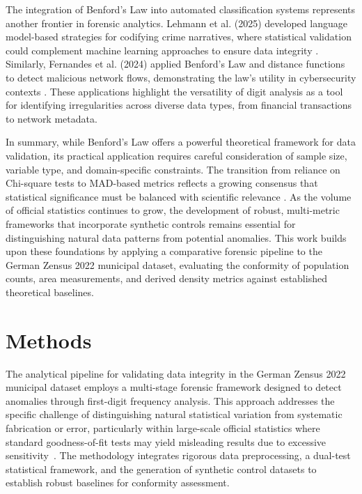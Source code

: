 \documentclass[11pt,a4paper]{article}
\begin{document}
The integration of Benford's Law into automated classification systems represents another frontier in forensic analytics. Lehmann et al. (2025) developed language model-based strategies for codifying crime narratives, where statistical validation could complement machine learning approaches to ensure data integrity \cite{Lehmann2025AutomatedCO}. Similarly, Fernandes et al. (2024) applied Benford's Law and distance functions to detect malicious network flows, demonstrating the law's utility in cybersecurity contexts \cite{Fernandes2024UnveilingMN}. These applications highlight the versatility of digit analysis as a tool for identifying irregularities across diverse data types, from financial transactions to network metadata.

In summary, while Benford's Law offers a powerful theoretical framework for data validation, its practical application requires careful consideration of sample size, variable type, and domain-specific constraints. The transition from reliance on Chi-square tests to MAD-based metrics reflects a growing consensus that statistical significance must be balanced with scientific relevance \cite{Kossler2024SomeNI}. As the volume of official statistics continues to grow, the development of robust, multi-metric frameworks that incorporate synthetic controls remains essential for distinguishing natural data patterns from potential anomalies. This work builds upon these foundations by applying a comparative forensic pipeline to the German Zensus 2022 municipal dataset, evaluating the conformity of population counts, area measurements, and derived density metrics against established theoretical baselines.

\section{Methods}
The analytical pipeline for validating data integrity in the German Zensus 2022 municipal dataset employs a multi-stage forensic framework designed to detect anomalies through first-digit frequency analysis. This approach addresses the specific challenge of distinguishing natural statistical variation from systematic fabrication or error, particularly within large-scale official statistics where standard goodness-of-fit tests may yield misleading results due to excessive sensitivity~\cite{Shalini2023DataQA}. The methodology integrates rigorous data preprocessing, a dual-test statistical framework, and the generation of synthetic control datasets to establish robust baselines for conformity assessment.
\end{document}

